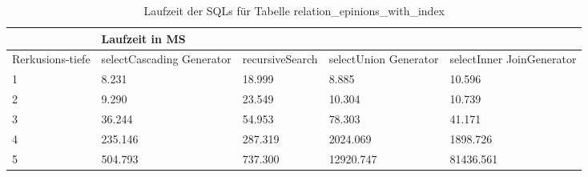 \begin{table}[H]
	\centering
	\begin{tabular}{l|l|l|l|l|l|}
		\cline{2-6}
		& \multicolumn{5}{|l|}{Laufzeit in MS}                                                                                                                                                  \\ \hline
		\multicolumn{1}{|l|}{\multirow{2}{2cm}{Rerkusions-tiefe}} & \multicolumn{2}{|l|}{\multirow{2}{3cm}{selectCascading Generator}} & \multirow{2}{2.8cm}{recursiveSearch} & \multirow{2}{2.5cm}{selectUnion Generator} & \multirow{2}{2.5cm}{selectInner JoinGenerator} \\
		\multicolumn{1}{|l|}{}
		& \multicolumn{2}{|l|}{}                                           &                                  &                                     &                                           \\ \hline
		
		
\multicolumn{1}{|l|}{1}                                 & \multicolumn{2}{l|}{8.231}                                       & 18.999                                                & 8.885                                                     & 10.596                                                          \\ \hline
\multicolumn{1}{|l|}{2}                                 & \multicolumn{2}{l|}{9.290}                                       & 23.549                                                & 10.304                                                    & 10.739                                                          \\ \hline
\multicolumn{1}{|l|}{3}                                 & \multicolumn{2}{l|}{36.244}                                      & 54.953                                                & 78.303                                                    & 41.171                                                          \\ \hline
\multicolumn{1}{|l|}{4}                                 & \multicolumn{2}{l|}{235.146}                                     & 287.319                                               & 2024.069                                                  & 1898.726                                                        \\ \hline
\multicolumn{1}{|l|}{5}                                 & \multicolumn{2}{l|}{504.793}                                     & 737.300                                               & 12920.747                                                 & 81436.561                                                       \\ \hline

	\end{tabular}
	\caption{Laufzeit der SQLs für Tabelle relation\_epinions\_with\_index}
	\label{2.relationepinionsindex.table}
\end{table}

